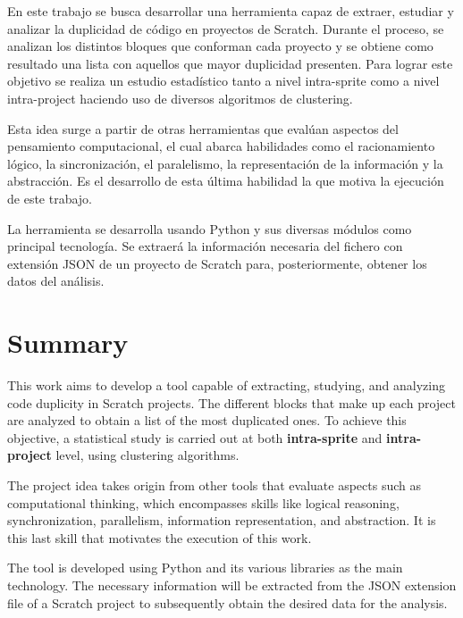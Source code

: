 \documentclass[a4paper, 12pt]{book}
\begin{document}
En este trabajo se busca desarrollar una herramienta capaz de extraer, estudiar y analizar la duplicidad de código en proyectos de Scratch. Durante el proceso, se analizan los distintos bloques que conforman cada proyecto y se obtiene como resultado una lista con aquellos que mayor duplicidad presenten. Para lograr este objetivo se realiza un estudio estadístico tanto a nivel intra-sprite como a nivel intra-project haciendo uso de diversos algoritmos de clustering.

Esta idea surge a partir de otras herramientas que evalúan aspectos del pensamiento computacional, el cual abarca habilidades como el racionamiento lógico, la sincronización, el paralelismo, la representación de la información y la abstracción. Es el desarrollo de esta última habilidad la que motiva la ejecución de este trabajo.

La herramienta se desarrolla usando Python y sus diversas módulos como principal tecnología. Se extraerá la información necesaria del fichero con extensión JSON de un proyecto de Scratch para, posteriormente, obtener los datos del análisis.


\chapter*{Summary}

This work aims to develop a tool capable of extracting, studying, and analyzing code duplicity in Scratch projects. The different blocks that make up each project are analyzed to obtain a list of the most duplicated ones. To achieve this objective, a statistical study is carried out at both \textbf{intra-sprite} and \textbf{intra-project} level, using clustering algorithms.

The project idea takes origin from other tools that evaluate aspects such as computational thinking, which encompasses skills like logical reasoning, synchronization, parallelism, information representation, and abstraction. It is this last skill that motivates the execution of this work.

The tool is developed using Python and its various libraries as the main technology. The necessary information will be extracted from the JSON extension file of a Scratch project to subsequently obtain the desired data for the analysis.
\end{document}
